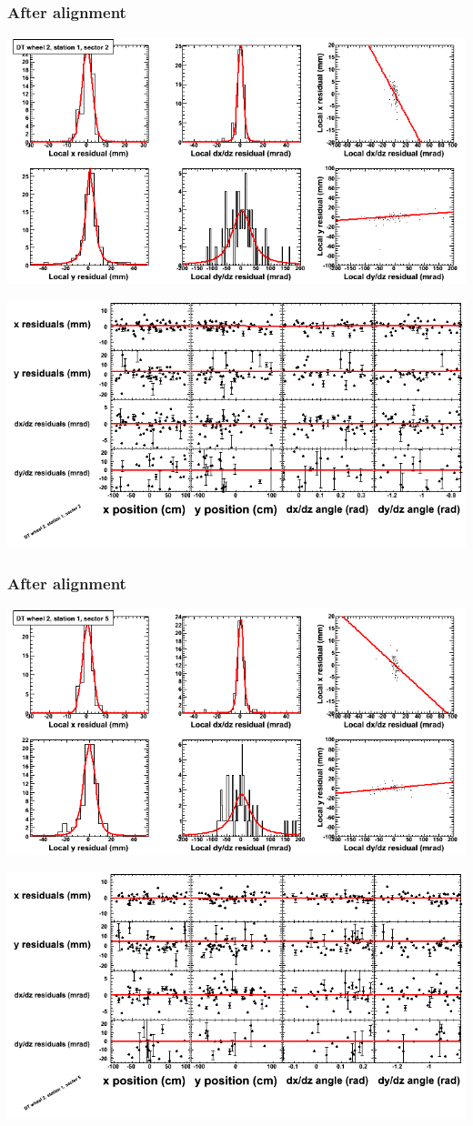 \documentclass[compress]{beamer}
\begin{document}
\begin{frame}
\frametitle{After alignment}
\includegraphics[width=0.7\linewidth]{NOV4_fitfunctions/MBwhEst1sec02_bellcurves.png}

\includegraphics[width=0.7\linewidth]{NOV4_fitfunctions/MBwhEst1sec02_polynomials.png}
\end{frame}

\begin{frame}
\frametitle{After alignment}
\includegraphics[width=0.7\linewidth]{NOV4_fitfunctions/MBwhEst1sec05_bellcurves.png}

\includegraphics[width=0.7\linewidth]{NOV4_fitfunctions/MBwhEst1sec05_polynomials.png}
\end{frame}
\end{document}
